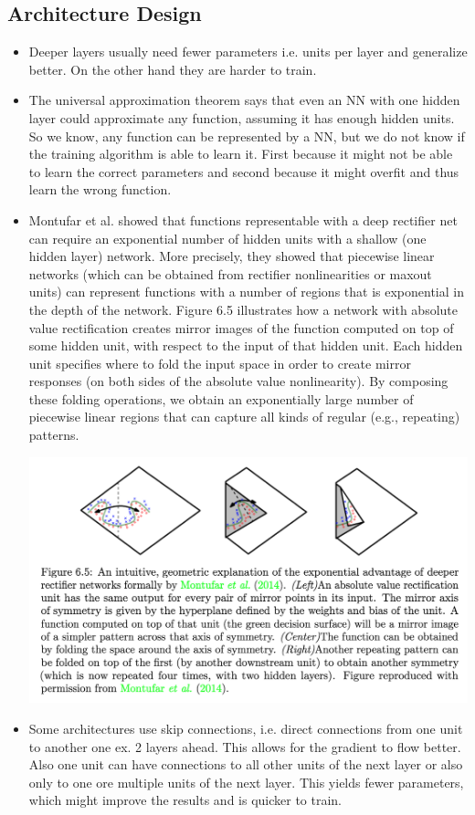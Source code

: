 \documentclass[a4paper]{article}
\begin{document}
\subsection{Architecture Design}
\begin{itemize}
\item Deeper layers usually need fewer parameters i.e. units per layer and generalize better. On the other hand they are harder to train. 
\item The universal approximation theorem says that even an NN with one hidden layer could approximate any function, assuming it has enough hidden units. So we know, any function can be represented by a NN, but we do not know if the training algorithm is able to learn it. First because it might not be able to learn the correct parameters and second because it might overfit and thus learn the wrong function.
\item Montufar et al. showed that functions representable with a deep rectifier net can require an exponential number of hidden units with a shallow (one hidden layer) network. More precisely, they showed that piecewise linear networks (which can be obtained from rectifier nonlinearities or maxout units) can represent functions with a number of regions that is exponential in the depth of the network. Figure 6.5 illustrates how a network with absolute value rectification creates mirror images of the function computed on top of some hidden unit, with respect to the input of that hidden unit. Each hidden unit specifies where to fold the input space in order to create mirror responses (on both sides of the absolute value nonlinearity). By composing these folding operations, we obtain an exponentially large number of piecewise linear regions that can capture all kinds of regular (e.g., repeating) patterns.
\begin{center}
\includegraphics[width=\textwidth]{image/folding.png}
\end{center}

\item Some architectures use skip connections, i.e. direct connections from one unit to another one ex. 2 layers ahead. This allows for the gradient to flow better. Also one unit can have connections to all other units of the next layer or also only to one ore multiple units of the next layer. This yields fewer parameters, which might improve the results and is quicker to train. 
\end{itemize}
\end{document}
